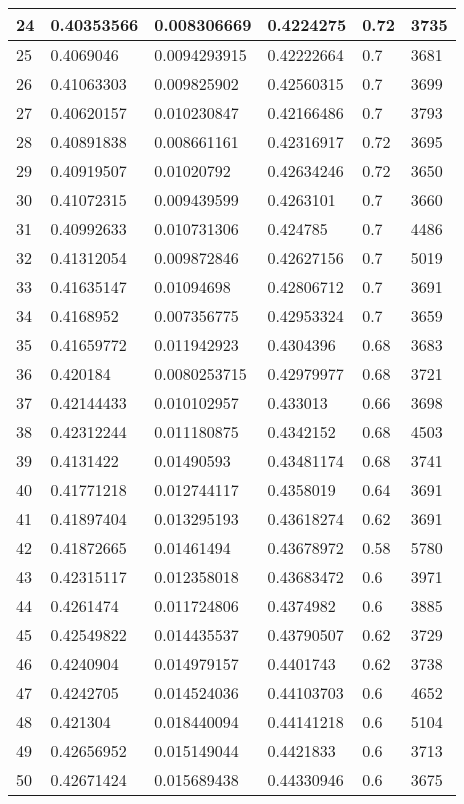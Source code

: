 \begin{longtable}{|l|l|l|l|l|l|}
24 & 0.40353566 & 0.008306669 & 0.4224275 & 0.72 & 3735 \\ \hline 
25 & 0.4069046 & 0.0094293915 & 0.42222664 & 0.7 & 3681 \\ \hline 
26 & 0.41063303 & 0.009825902 & 0.42560315 & 0.7 & 3699 \\ \hline 
27 & 0.40620157 & 0.010230847 & 0.42166486 & 0.7 & 3793 \\ \hline 
28 & 0.40891838 & 0.008661161 & 0.42316917 & 0.72 & 3695 \\ \hline 
29 & 0.40919507 & 0.01020792 & 0.42634246 & 0.72 & 3650 \\ \hline 
30 & 0.41072315 & 0.009439599 & 0.4263101 & 0.7 & 3660 \\ \hline 
31 & 0.40992633 & 0.010731306 & 0.424785 & 0.7 & 4486 \\ \hline 
32 & 0.41312054 & 0.009872846 & 0.42627156 & 0.7 & 5019 \\ \hline 
33 & 0.41635147 & 0.01094698 & 0.42806712 & 0.7 & 3691 \\ \hline 
34 & 0.4168952 & 0.007356775 & 0.42953324 & 0.7 & 3659 \\ \hline 
35 & 0.41659772 & 0.011942923 & 0.4304396 & 0.68 & 3683 \\ \hline 
36 & 0.420184 & 0.0080253715 & 0.42979977 & 0.68 & 3721 \\ \hline 
37 & 0.42144433 & 0.010102957 & 0.433013 & 0.66 & 3698 \\ \hline 
38 & 0.42312244 & 0.011180875 & 0.4342152 & 0.68 & 4503 \\ \hline 
39 & 0.4131422 & 0.01490593 & 0.43481174 & 0.68 & 3741 \\ \hline 
40 & 0.41771218 & 0.012744117 & 0.4358019 & 0.64 & 3691 \\ \hline 
41 & 0.41897404 & 0.013295193 & 0.43618274 & 0.62 & 3691 \\ \hline 
42 & 0.41872665 & 0.01461494 & 0.43678972 & 0.58 & 5780 \\ \hline 
43 & 0.42315117 & 0.012358018 & 0.43683472 & 0.6 & 3971 \\ \hline 
44 & 0.4261474 & 0.011724806 & 0.4374982 & 0.6 & 3885 \\ \hline 
45 & 0.42549822 & 0.014435537 & 0.43790507 & 0.62 & 3729 \\ \hline 
46 & 0.4240904 & 0.014979157 & 0.4401743 & 0.62 & 3738 \\ \hline 
47 & 0.4242705 & 0.014524036 & 0.44103703 & 0.6 & 4652 \\ \hline 
48 & 0.421304 & 0.018440094 & 0.44141218 & 0.6 & 5104 \\ \hline 
49 & 0.42656952 & 0.015149044 & 0.4421833 & 0.6 & 3713 \\ \hline 
50 & 0.42671424 & 0.015689438 & 0.44330946 & 0.6 & 3675 \\ \hline 
\end{longtable}